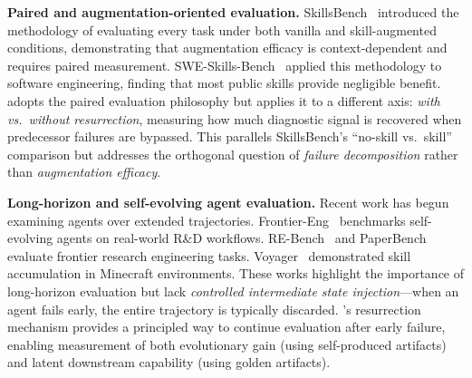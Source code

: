 
\textbf{Paired and augmentation-oriented evaluation.}
SkillsBench~\cite{li2026skillsbench} introduced the methodology of evaluating every task under both vanilla and skill-augmented conditions, demonstrating that augmentation efficacy is context-dependent and requires paired measurement.
SWE-Skills-Bench~\cite{sweskillsbench2026} applied this methodology to software engineering, finding that most public skills provide negligible benefit.
\eva{} adopts the paired evaluation philosophy but applies it to a different axis: \emph{with vs.\ without resurrection}, measuring how much diagnostic signal is recovered when predecessor failures are bypassed.
This parallels SkillsBench's ``no-skill vs.\ skill'' comparison but addresses the orthogonal question of \emph{failure decomposition} rather than \emph{augmentation efficacy}.


\textbf{Long-horizon and self-evolving agent evaluation.}
Recent work has begun examining agents over extended trajectories.
Frontier-Eng~\cite{frontiereng2026} benchmarks self-evolving agents on real-world R&D workflows.
RE-Bench~\cite{rebench2024} and PaperBench~\cite{paperbench2025} evaluate frontier research engineering tasks.
Voyager~\cite{wang2023voyager} demonstrated skill accumulation in Minecraft environments.
These works highlight the importance of long-horizon evaluation but lack \emph{controlled intermediate state injection}---when an agent fails early, the entire trajectory is typically discarded.
\eva{}'s resurrection mechanism provides a principled way to continue evaluation after early failure, enabling measurement of both evolutionary gain (using self-produced artifacts) and latent downstream capability (using golden artifacts).